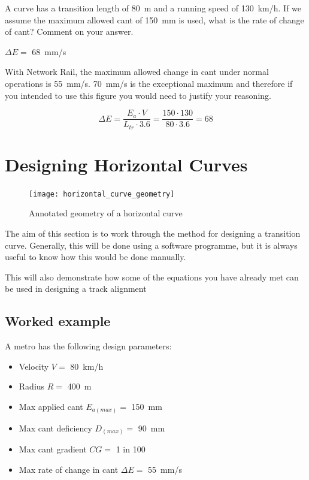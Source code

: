 \documentclass{bcrre_exam}
\begin{document}
\begin{questions}
    \question
    A curve has a transition length of \qty{80}{m} and a running speed of \qty{130}{km/h}. If we assume the maximum allowed cant of \qty{150}{mm} is used, what is the rate of change of cant? Comment on your answer.

    \begin{solution}
        $\Delta E=$ \qty{68}{mm/s}

        With Network Rail, the maximum allowed change in cant under normal operations is \qty{55}{mm/s}. \qty{70}{mm/s} is the exceptional maximum and therefore if you intended to use this figure you would need to justify your reasoning.

        \begin{equation}
            \Delta E=\frac{E_a \cdot V}{L_{tr} \cdot 3.6}=\frac{150 \cdot 130}{80 \cdot 3.6}=68
        \end{equation}
    \end{solution}
\end{questions}

\newpage
\section{Designing Horizontal Curves}

\begin{figure}[h]
    \centering
    \texttt{[image: horizontal\_curve\_geometry]}
    \caption{Annotated geometry of a horizontal curve}
    \label{fig:horizontal-curve-geometry}
\end{figure}

The aim of this section is to work through the method for designing a transition curve. Generally, this will be done using a software programme, but it is always useful to know how this would be done manually.

This will also demonstrate how some of the equations you have already met can be used in designing a track alignment

\subsection*{Worked example}

A metro has the following design parameters:
\begin{itemize}
    \item Velocity $V=$ \qty{80}{km/h}
    \item Radius $R=$ \qty{400}{m}
    \item Max applied cant $E_{a(max)}=$ \qty{150}{mm}
    \item Max cant deficiency $D_{(max)}=$ \qty{90}{mm}
    \item Max cant gradient $CG=$ \num{1} in \num{100}
    \item Max rate of change in cant $\Delta E=$ \qty{55}{mm/s}
\end{itemize}
\end{document}
